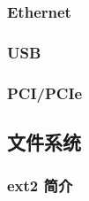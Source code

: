 \subsubsection{Ethernet}

\subsubsection{USB}

\subsubsection{PCI/PCIe}

\subsection{文件系统}

\subsubsection{ext2 简介}
